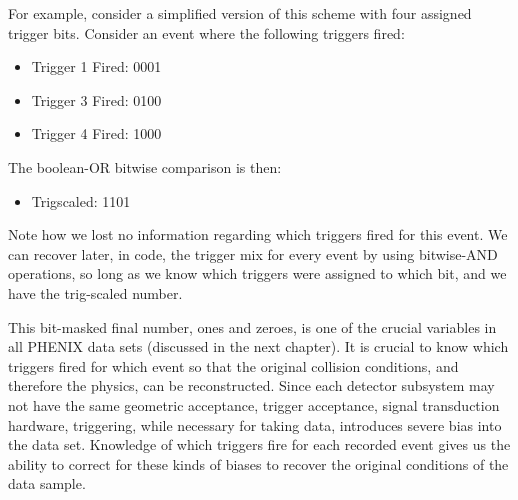 For example, consider a simplified version of this scheme with four assigned
trigger bits. Consider an event where the following triggers fired:

\begin{itemize}
    \item Trigger 1 Fired: 0001
    \item Trigger 3 Fired: 0100
    \item Trigger 4 Fired: 1000
\end{itemize}

The boolean-OR bitwise comparison is then:

\begin{itemize}
  \item Trigscaled: 1101
\end{itemize}

Note how we lost no information regarding which triggers fired for this event.
We can recover later, in code, the trigger mix for every event by using
bitwise-AND operations, so long as we know which triggers were assigned to which
bit, and we have the trig-scaled number.

This bit-masked final number, ones and zeroes, is one of the crucial variables
in all PHENIX data sets (discussed in the next chapter). It is crucial to know
which triggers fired for which event so that the original collision conditions,
and therefore the physics, can be reconstructed. Since each detector subsystem
may not have the same geometric acceptance, trigger acceptance, signal
transduction hardware, triggering, while necessary for taking data, introduces
severe bias into the data set. Knowledge of which triggers fire for each
recorded event gives us the ability to correct for these kinds of biases to
recover the original conditions of the data sample.
